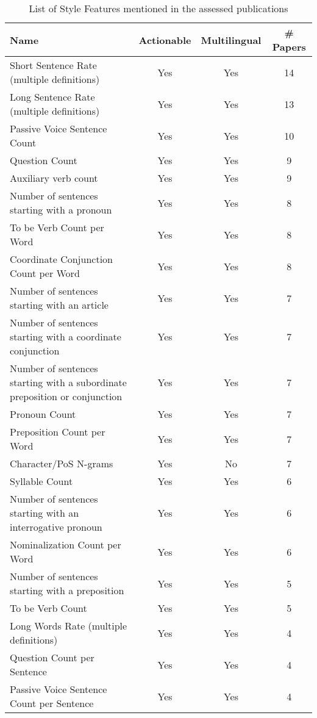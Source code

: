 \begin{table}[htbp]
    \caption{List of Style Features mentioned in the assessed publications}
    \label{tab:feat_Style}
    \centering
    \begin{tabular}{m{} c c c}
        \toprule
        \textbf{Name} & \textbf{Actionable} & \textbf{Multilingual} & \textbf{\# Papers} \\ 
        \midrule
        Short Sentence Rate (multiple definitions)  & Yes & Yes & 14 \\
        Long Sentence Rate (multiple definitions) & Yes & Yes & 13 \\
        Passive Voice Sentence Count & Yes & Yes & 10 \\
        Question Count & Yes & Yes & 9 \\
        Auxiliary verb count & Yes & Yes & 9 \\
        Number of sentences starting with a pronoun & Yes & Yes & 8 \\
        To be Verb Count per Word & Yes & Yes & 8 \\
        Coordinate Conjunction Count per Word & Yes & Yes & 8 \\
        Number of sentences starting with an article & Yes & Yes & 7 \\
        Number of sentences starting with a coordinate conjunction & Yes & Yes & 7 \\
        Number of sentences starting with a subordinate preposition or conjunction & Yes & Yes & 7 \\
        Pronoun Count & Yes & Yes & 7 \\
        Preposition Count per Word & Yes & Yes & 7 \\
        Character/PoS N-grams & Yes & No & 7 \\
        Syllable Count & Yes & Yes & 6 \\
        Number of sentences starting with an interrogative pronoun & Yes & Yes & 6 \\
        Nominalization Count per Word & Yes & Yes & 6 \\
        Number of sentences starting with a preposition & Yes & Yes & 5 \\
        To be Verb Count & Yes & Yes & 5 \\
        Long Words Rate (multiple definitions) & Yes & Yes & 4 \\
        Question Count per Sentence & Yes & Yes & 4 \\
        Passive Voice Sentence Count per Sentence & Yes & Yes & 4 \\

\end{tabular}
\end{table}
